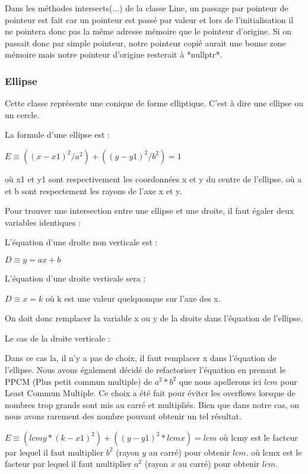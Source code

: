 \documentclass[]{article}
\begin{document}
Dans les méthodes intersects(...) de la classe Line, un passage
par pointeur de pointeur est fait car un pointeur est passé par 
valeur et lors de l'initialisation il ne pointera donc pas la même
adresse mémoire que le pointeur d'origine.
Si on passait donc par simple pointeur, notre pointeur copié
aurait une bonne zone mémoire mais notre pointeur d'origine
resterait à *nullptr*.

\subsubsection{Ellipse}


Cette classe représente une conique de forme elliptique.
C'est à dire une ellipse ou un cercle.

La formule d'une ellipse est : 

$ E \equiv ((x - x1)^2 / a^2) + ((y - y1)^2 / b^2) = 1 $

où x1 et y1 sont respectivement les coordonnées
x et y du centre de l'ellipse.
où a et b sont respectement les rayons de l'axe
x et y.

Pour trouver une intersection entre une ellipse
et une droite, il faut égaler deux variables 
identiques :

L'équation d'une droite non verticale est : 

    $D \equiv y = ax + b$

L'équation d'une droite verticale sera : 

    $D \equiv x = k$
        où k est une valeur quelquonque sur l'axe des x.

On doit donc remplacer la variable x ou y de la droite dans
l'équation de l'ellipse.

Le cas de la droite verticale : 

Dans ce cas la, il n'y a pas de choix, il faut remplacer
x dans l'équation de l'ellipse.
Nous avons également décidé de refactoriser l'équation en 
prenant le PPCM (Plus petit commun multiple) de $a^2 * b^2$ que
nous apellerons ici $lcm$ pour Least Commun Multiple.
Ce choix a été fait pour éviter les overflows lorsque 
de nombres trop grands sont mis au carré et multipliés.
Bien que dans notre cas, on nous avons rarement des nombre
pouvant obtenir un tel résultat.

$E \equiv (lcmy * (k - x1)^2) + ((y - y1)^2 * lcmx) = lcm$  
    où lcmy est le facteur par lequel il faut multiplier
    $b^2$ (rayon $y$ au carré) pour obtenir $lcm$.
    où lcmx est le facteur par lequel il faut multiplier
    $a^2$ (rayon $x$ au carré) pour obtenir $lcm$.
\end{document}
